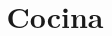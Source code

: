 \documentclass[a4paper, pagesize, DIV=15, fontsize=8pt, parskip=half, twoside, BCOR=5mm]{scrartcl}
\begin{document}
\title{Cocina}
\date{}

\maketitle


\tableofcontents

\begin{paracol}{2}

\end{paracol}
\end{document}
